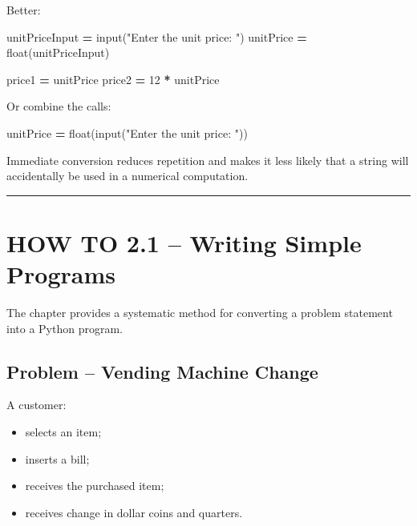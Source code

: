 \documentclass[
]{article}
\newenvironment{Shaded}{\begin{snugshade}}{\end{snugshade}}
\newcommand{\BuiltInTok}[1]{#1}
\newcommand{\DecValTok}[1]{\textcolor[rgb]{0.00,0.00,0.81}{#1}}
\newcommand{\NormalTok}[1]{#1}
\newcommand{\OperatorTok}[1]{\textcolor[rgb]{0.81,0.36,0.00}{\textbf{#1}}}
\newcommand{\StringTok}[1]{\textcolor[rgb]{0.31,0.60,0.02}{#1}}
\providecommand{\tightlist}{%
  \setlength{\itemsep}{0pt}\setlength{\parskip}{0pt}}
\begin{document}
Better:

\begin{Shaded}
\begin{Highlighting}[]
\NormalTok{unitPriceInput }\OperatorTok{=} \BuiltInTok{input}\NormalTok{(}\StringTok{"Enter the unit price: "}\NormalTok{)}
\NormalTok{unitPrice }\OperatorTok{=} \BuiltInTok{float}\NormalTok{(unitPriceInput)}

\NormalTok{price1 }\OperatorTok{=}\NormalTok{ unitPrice}
\NormalTok{price2 }\OperatorTok{=} \DecValTok{12} \OperatorTok{*}\NormalTok{ unitPrice}
\end{Highlighting}
\end{Shaded}

Or combine the calls:

\begin{Shaded}
\begin{Highlighting}[]
\NormalTok{unitPrice }\OperatorTok{=} \BuiltInTok{float}\NormalTok{(}\BuiltInTok{input}\NormalTok{(}\StringTok{"Enter the unit price: "}\NormalTok{))}
\end{Highlighting}
\end{Shaded}

Immediate conversion reduces repetition and makes it less likely that a
string will accidentally be used in a numerical computation.

\begin{center}\rule{0.5\linewidth}{0.5pt}\end{center}

\section{HOW TO 2.1 -- Writing Simple
Programs}\label{how-to-2.1-writing-simple-programs}

The chapter provides a systematic method for converting a problem
statement into a Python program.

\subsection{Problem -- Vending Machine
Change}\label{problem-vending-machine-change}

A customer:

\begin{itemize}
\tightlist
\item
  selects an item;
\item
  inserts a bill;
\item
  receives the purchased item;
\item
  receives change in dollar coins and quarters.
\end{itemize}
\end{document}
